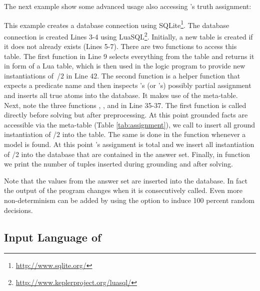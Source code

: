 \begin{example}
The next example show some advanced usage also accessing \clasp's truth assignment:

This example creates a database connection using SQLite\footnote{\url{http://www.sqlite.org/}}.
The database connection is created Lines 3-4 using LuaSQL\footnote{\url{http://www.keplerproject.org/luasql/}}.
Initially, a new table  is created if it does not already exists (Lines 5-7).
There are two functions to access this table.
The first function  in Line 9 selects everything from the table and 
returns it in form of a Lua table, which is then used in the logic program
to provide new instantiations of~/$2$ in Line 42.
The second function  is a helper function that expects a predicate name
and then inspects \clingo's (or \iclingo's) possibly partial assignment and
inserts all true atoms into the database.
It makes use of the  meta-table.
Next, note the three functions
,
, and
in Line 35-37.
The first function is called directly before solving but after preprocessing.
At this point grounded facts are accessible via the  meta-table (Table \ref{tab:assignment}),
we call  to insert all ground instantiation of /$2$ into the  table.
The same is done in the  function whenever a model is found.
At this point \clingo's assignment is total and 
we insert all instantiation of /2 into the database that are contained in the answer set.
Finally, in function  we print the number of tuples inserted during grounding and after solving.

Note that the values from the answer set are inserted into the database.
In fact the output of the program changes when it is consecutively called.
Even more non-determinism can be added by using the option 
to induce 100 percent random decisions.
\eexample
\end{example}

\subsection{Input Language of \iclingo}\label{subsec:lang:iclingo}

